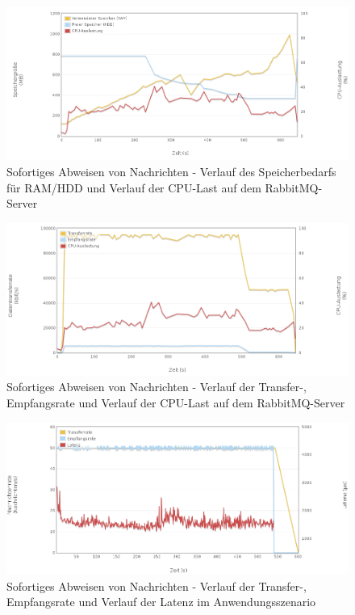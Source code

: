 \documentclass[	a4paper,
			11pt,
			titlepage,
			oneside,
			fleqn,
			listof=totoc,
			parskip,
			numbers=noenddot]{scrartcl}
\begin{document}
		\begin{figure}[!htb]
			\centering
			\includegraphics[width=\textwidth]{img/reject/reject_server1.png}
			\caption{Sofortiges Abweisen von Nachrichten - Verlauf des Speicherbedarfs für RAM/HDD und Verlauf der CPU-Last auf dem RabbitMQ-Server}
			\label{fig:reject-server1}
		\end{figure}
		
		\begin{figure}[!htb]
			\centering
			\includegraphics[width=\textwidth]{img/reject/reject_server2.png}
			\caption{Sofortiges Abweisen von Nachrichten - Verlauf der Transfer-, Empfangsrate und Verlauf der CPU-Last auf dem RabbitMQ-Server}
			\label{fig:reject-server2}
		\end{figure}
		
		\begin{figure}[!htb]
			\centering
			\includegraphics[width=\textwidth]{img/reject/reject_scenario.png}
			\caption{Sofortiges Abweisen von Nachrichten - Verlauf der Transfer-, Empfangsrate und Verlauf der Latenz im Anwendungsszenario}
			\label{fig:reject-scenario}
		\end{figure}
	
\end{document}
